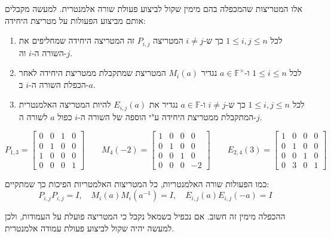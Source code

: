 \documentclass{tstextbook}
\begin{document}
\begin{definition}
אלו המטריצות שהמכפלה בהם מימין שקול לביצוע פעולת שורה אלמנטרית. למעשה מקבלים אותם מביצוע הפעולות על מטריצת היחידה:

  \begin{enumerate}
    \item לכל \(1\leq i,j\leq n\) כך ש-\(i\neq j\) המטריצה \(P_{i,j}\) זה המטריצה היחידה שמחליפים את השורה ה-\(i\) וה-\(j\). 


    \item לכל \(1\leq i\leq n\) ו-\(a \in \mathbb{F} ^{\times}\) נגדיר \(M_{i}(a)\) המטריצת שמתקבלת ממטריצת היחידה לאחר הכפלת השורה ה-\(i\) ב-\(a\). 


    \item לכל \(1\leq i,j\leq n\) כך ש-\(i\neq j\) ו-\(a \in \mathbb{F}\) נגדיר את \(E_{i,j}(a)\) להיות המטריצה האלמנטרית המתקבלת ממטריצת היחידה ע"י הוספה של השורה ה-\(i\) כפול \(a\) לשורה ה-\(j\). 


  \end{enumerate}
\end{definition}
\begin{example}
$$P_{1,3}=\begin{bmatrix}0&0&1&0\\ 0&1&0&0\\ 1&0&0&0\\ 0&0&0&1\end{bmatrix}\qquad M_{4}(-2)=\begin{bmatrix}1&0&0&0\\ 0&1&0&0\\ 0&0&1&0\\ 0&0&0&-2\end{bmatrix}\qquad E_{2,4}(3)=\begin{bmatrix}1&0&0&0\\ 0&1&0&0\\ 0&0&1&0\\ 0&3&0&1\end{bmatrix}$$

\end{example}
\begin{corollary}
כמו הפעולות שורה האלמנטריות, כל המטריצות האלמטריות הפיכות כך שמתקיים:
$$P_{i,j}P_{i,j}=I,\quad M_{i}(a)M_{i}(a^{-1})=I,\quad E_{i,j}(a)E_{i,j}(-a)=I$$

\end{corollary}
\begin{remark}
ההכפלה מימין זה חשוב. אם נכפיל בשמאל נקבל כי המטריצה פועלת על העמודות, ולכן למעשה יהיה שקול לביצוע פעולת עמודה אלמנטרית. 

\end{remark}
\end{document}
